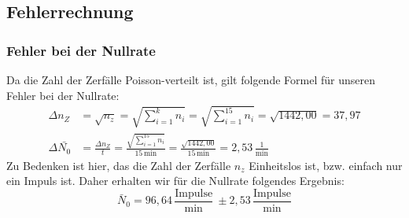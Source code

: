 \documentclass[fontsize=12pt]{scrartcl}
\begin{document}
\subsection{Fehlerrechnung}

\subsubsection{Fehler bei der Nullrate}
Da die Zahl der Zerfälle Poisson-verteilt ist, gilt folgende Formel für unseren Fehler bei der Nullrate:
\begin{align*}
\Delta n_Z &= \sqrt{n_z}=\sqrt{\sum_{i=1}^k {n_i}} =\sqrt{ \sum_{i=1}^{15} {n_i}} =\sqrt{1442,00} = 37,97 \\
\Delta \bar{N_0} &= \frac{\Delta n_Z}{t} = \frac{\sqrt{ \sum_{i=1}^{15} {n_i}}}{15\,\text{min}} = \frac{\sqrt{1442,00}}{15\,\text{min}} = 2,53\,\frac{1}{\text{min}}
\end{align*}
Zu Bedenken ist hier, das die Zahl der Zerfälle $n_z$ Einheitslos ist, bzw. einfach nur ein Impuls ist.
Daher erhalten wir für die Nullrate folgendes Ergebnis:
\begin{equation*}
\bar{N}_0= 96,64\,\frac{\text{Impulse}}{\text{min}}~\pm2,53\,\frac{\text{Impulse}}{\text{min}}
\end{equation*}
\end{document}
